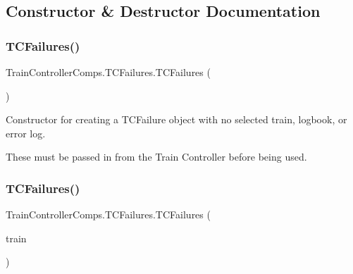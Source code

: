 \subsection{Constructor \& Destructor Documentation}
\mbox{\label{classTrainControllerComps_1_1TCFailures_afbf09a8c516634c2376901ca04bebae9}} 
\subsubsection{\texorpdfstring{T\+C\+Failures()}{TCFailures()}\hspace{0.1cm}{\footnotesize\ttfamily [1/2]}}
{\footnotesize\ttfamily Train\+Controller\+Comps.\+T\+C\+Failures.\+T\+C\+Failures (\begin{DoxyParamCaption}{ }\end{DoxyParamCaption})}



Constructor for creating a T\+C\+Failure object with no selected train, logbook, or error log. 

These must be passed in from the Train Controller before being used. \mbox{\label{classTrainControllerComps_1_1TCFailures_a021613d630232111e9a30398d15dcd51}} 
\subsubsection{\texorpdfstring{T\+C\+Failures()}{TCFailures()}\hspace{0.1cm}{\footnotesize\ttfamily [2/2]}}
{\footnotesize\ttfamily Train\+Controller\+Comps.\+T\+C\+Failures.\+T\+C\+Failures (\begin{DoxyParamCaption}\item[{\hyperlink{classTrainControllerComps_1_1TestTrain}{Test\+Train}}]{train }\end{DoxyParamCaption})}



